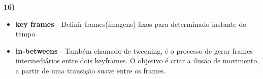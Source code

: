 \textbf{16)} 

\begin{itemize}
    \item \textbf{key frames} - Definir frames(imagens) fixos para determinado 
    instante do tempo

    \item \textbf{in-betweens} - Também chamado de tweening, é o processo de gerar frames intermediários
    entre dois keyframes. O objetivo é criar a ilusão de movimento, a partir de uma transição suave entre 
    os frames.
\end{itemize}


